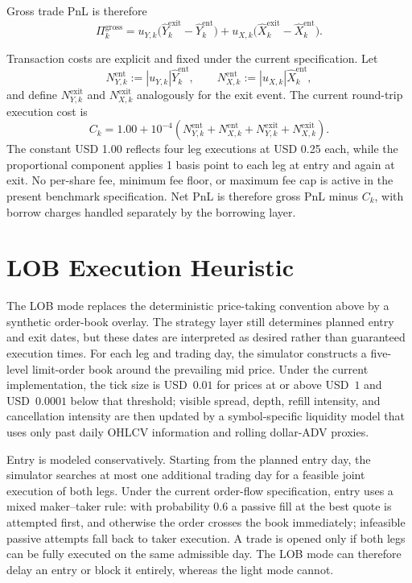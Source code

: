 \documentclass[11pt,a4paper]{article}
\begin{document}
Gross trade PnL is therefore
\[
\Pi^{\mathrm{gross}}_k
=
u_{Y,k}\bigl(\hat Y^{\mathrm{exit}}_k-\hat Y^{\mathrm{ent}}_k\bigr)
+
u_{X,k}\bigl(\hat X^{\mathrm{exit}}_k-\hat X^{\mathrm{ent}}_k\bigr).
\]

Transaction costs are explicit and fixed under the current specification. Let
\[
N^{\mathrm{ent}}_{Y,k} := |u_{Y,k}| \hat Y^{\mathrm{ent}}_k,
\qquad
N^{\mathrm{ent}}_{X,k} := |u_{X,k}| \hat X^{\mathrm{ent}}_k,
\]
and define \(N^{\mathrm{exit}}_{Y,k}\) and \(N^{\mathrm{exit}}_{X,k}\) analogously for the exit event.
The current round-trip execution cost is
\[
C_k
=
1.00
+
10^{-4}
\left(
N^{\mathrm{ent}}_{Y,k}
+
N^{\mathrm{ent}}_{X,k}
+
N^{\mathrm{exit}}_{Y,k}
+
N^{\mathrm{exit}}_{X,k}
\right).
\]
The constant USD 1.00 reflects four leg executions at USD 0.25 each, while the proportional
component applies 1 basis point to each leg at entry and again at exit. No per-share fee, minimum
fee floor, or maximum fee cap is active in the present benchmark specification. Net PnL is therefore
gross PnL minus \(C_k\), with borrow charges handled separately by the borrowing layer.

\section{LOB Execution Heuristic}\label{sec:lob_execution}

The LOB mode replaces the deterministic price-taking convention above by a
synthetic order-book overlay. The strategy layer still determines planned entry
and exit dates, but these dates are interpreted as desired rather than
guaranteed execution times. For each leg and trading day, the simulator
constructs a five-level limit-order book around the prevailing mid price. Under
the current implementation, the tick size is USD~\(0.01\) for prices at or
above USD~\(1\) and USD~\(0.0001\) below that threshold; visible spread, depth,
refill intensity, and cancellation intensity are then updated by a
symbol-specific liquidity model that uses only past daily OHLCV information and
rolling dollar-ADV proxies.

Entry is modeled conservatively. Starting from the planned entry day, the
simulator searches at most one additional trading day for a feasible joint
execution of both legs. Under the current order-flow specification, entry uses
a mixed maker--taker rule: with probability \(0.6\) a passive fill at the best
quote is attempted first, and otherwise the order crosses the book immediately;
infeasible passive attempts fall back to taker execution. A trade is opened
only if both legs can be fully executed on the same admissible day. The LOB
mode can therefore delay an entry or block it entirely, whereas the light mode
cannot.
\end{document}
